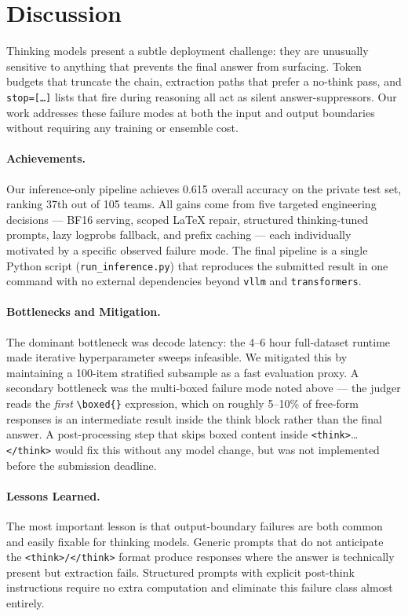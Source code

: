 \documentclass{article}
\begin{document}
\section{Discussion}
\label{sec:discussion}

Thinking models present a subtle deployment challenge: they are unusually
sensitive to anything that prevents the final answer from surfacing.
Token budgets that truncate the chain, extraction paths that prefer a
no-think pass, and \texttt{stop=[\ldots]} lists that fire during reasoning all
act as silent answer-suppressors.
Our work addresses these failure modes at both the input and output boundaries
without requiring any training or ensemble cost.

\paragraph{Achievements.}
Our inference-only pipeline achieves 0.615 overall accuracy on the private
test set, ranking 37th out of 105 teams.
All gains come from five targeted engineering decisions — BF16 serving,
scoped LaTeX repair, structured thinking-tuned prompts, lazy logprobs
fallback, and prefix caching — each individually motivated by a specific
observed failure mode.
The final pipeline is a single Python script (\texttt{run\_inference.py})
that reproduces the submitted result in one command with no external
dependencies beyond \texttt{vllm} and \texttt{transformers}.

\paragraph{Bottlenecks and Mitigation.}
The dominant bottleneck was decode latency: the 4--6 hour full-dataset
runtime made iterative hyperparameter sweeps infeasible.
We mitigated this by maintaining a 100-item stratified subsample as a fast
evaluation proxy.
A secondary bottleneck was the multi-boxed failure mode noted above — the
judger reads the \emph{first} \texttt{\textbackslash boxed\{\}} expression,
which on roughly 5--10\% of free-form responses is an intermediate result
inside the think block rather than the final answer.
A post-processing step that skips boxed content inside
\texttt{<think>}\ldots\texttt{</think>} would fix this without any model
change, but was not implemented before the submission deadline.

\paragraph{Lessons Learned.}
The most important lesson is that output-boundary failures are both common
and easily fixable for thinking models.
Generic prompts that do not anticipate the \texttt{<think>/</think>} format
produce responses where the answer is technically present but
extraction fails.
Structured prompts with explicit post-think instructions require no extra
computation and eliminate this failure class almost entirely.
\end{document}
